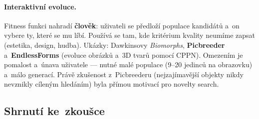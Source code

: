\documentclass[11pt,a4paper]{article}
\theoremstyle{definition}
\begin{document}
\paragraph{Interaktivní evoluce.} Fitness funkci nahradí \textbf{člověk}: uživateli se
předloží populace kandidátů a~on vybere ty, které se mu líbí. Používá se tam, kde kritérium
kvality neumíme zapsat (estetika, design, hudba). Ukázky: Dawkinsovy \emph{Biomorphs},
\textbf{Picbreeder} a~\textbf{EndlessForms} (evoluce obrázků a~3D tvarů pomocí CPPN).
Omezením je pomalost a~únava uživatele --- nutné malé populace (9--20 jedinců na obrazovku)
a~málo generací. Právě zkušenost z~Picbreederu (nejzajímavější objekty nikdy nevznikly
cíleným hledáním) byla přímou motivací pro novelty search.

\subsection{Shrnutí ke~zkoušce}
\end{document}
